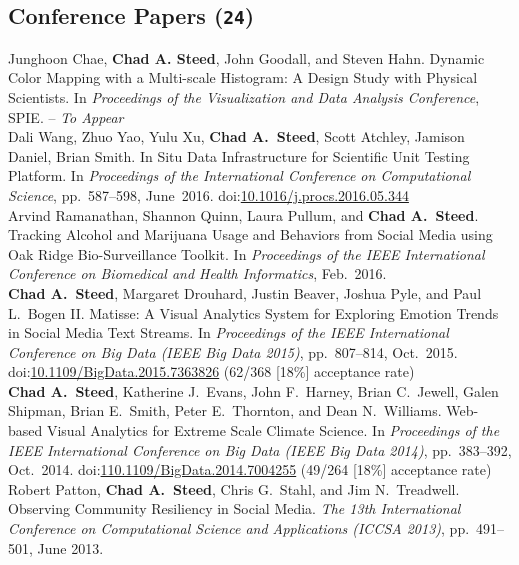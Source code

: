 \documentclass[11pt, letterpaper]{article}
\newcommand{\years}[1]{\marginnote{\scriptsize #1}}
\begin{document}
\subsection*{Conference Papers (\texttt{24})}
\begin{sloppypar}
\noindent\years{2019}Junghoon Chae, \textbf{Chad A. Steed}, John Goodall, and Steven Hahn. Dynamic Color Mapping with a Multi-scale Histogram: A Design Study with Physical Scientists. In
\emph{Proceedings of the Visualization and Data Analysis Conference}, SPIE. --
\emph{To Appear}\\
\years{2016}Dali Wang, Zhuo Yao, Yulu Xu, \textbf{Chad A.\ Steed},
Scott Atchley, Jamison Daniel, Brian Smith. In Situ Data Infrastructure for
Scientific Unit Testing Platform.
In \emph{Proceedings of the International Conference on Computational Science},
pp.\ 587--598, June\ 2016. doi:\href{http://dx.doi.org/10.1016/j.procs.2016.05.344}{10.1016/j.procs.2016.05.344}\\
\years{2016}Arvind Ramanathan, Shannon Quinn, Laura Pullum, and
\textbf{Chad A.\ Steed}. Tracking Alcohol and Marijuana Usage and Behaviors
from Social Media using Oak Ridge Bio-Surveillance Toolkit.
In \emph{Proceedings of the IEEE International Conference on Biomedical and
Health Informatics}, Feb.\ 2016.\\
\years{2015}\textbf{Chad A.\ Steed}, Margaret Drouhard, Justin
Beaver, Joshua Pyle, and Paul L.\ Bogen II. Matisse: A Visual Analytics
System for Exploring Emotion Trends in Social Media Text Streams.
In \emph{Proceedings of the IEEE International Conference on Big Data (IEEE
Big Data 2015)}, pp.\ 807--814, Oct.\ 2015. doi:\href{http://dx.doi.org/10.1109/BigData.2015.7363826}{10.1109/BigData.2015.7363826} (62/368 [18\%] acceptance rate)\\
\years{2014}\textbf{Chad A.\ Steed}, Katherine J.\ Evans, John F.\ Harney,
Brian C.\ Jewell, Galen Shipman, Brian E.\ Smith, Peter E.\ Thornton, and
Dean N.\ Williams. Web-based Visual Analytics for Extreme Scale Climate Science.
In \emph{Proceedings of the IEEE International Conference on Big Data (IEEE Big Data 2014)},
pp.\ 383--392, Oct.\ 2014.
doi:\href{http://dx.doi.org/10.1109/BigData.2014.7004255}{110.1109/BigData.2014.7004255} (49/264 [18\%] acceptance rate)\\
\years{2013}Robert Patton, \textbf{Chad A.\ Steed}, Chris G.\ Stahl, and
Jim N.\ Treadwell. Observing Community Resiliency in Social Media. \emph{The 13th
International Conference on Computational Science and Applications (ICCSA 2013)},
pp.\ 491--501, June 2013.

\end{sloppypar}
\end{document}
